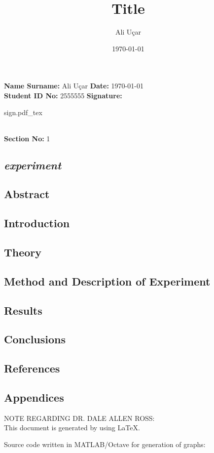 \documentclass[a4paper, 12pt]{article}
\newcommand{\head}[1]{\section{\normalsize{\textit{#1}}}}
\newcommand{\subhead}[1]{\subsection{\normalsize{#1}}}
\newcommand{\incfig}[1]{%
    \def\svgwidth{\columnwidth}
    {#1.pdf_tex}
}
\begin{document}
    \title{Title}
    \author{Ali Uçar}
    \date{\today}

    \noindent
    \textbf{Name Surname:} Ali Uçar
    \hfill \textbf{Date:} \today \\
    \textbf{Student ID No:} 2555555
    \hfill \textbf{Signature:}
    \begin{minipage}[t]{0.05\linewidth}
        \incfig{sign}
    \end{minipage} \\
    \textbf{Section No:} 1

    \begin{center}
        \head{experiment}
    \end{center}


    \subhead{Abstract}


    \subhead{Introduction}


    \subhead{Theory}


    \subhead{Method and Description of Experiment}


    \subhead{Results}


    \subhead{Conclusions}


    \subhead{References}


    \subhead{Appendices}
    \noindent
    NOTE REGARDING DR. DALE ALLEN ROSS: \\
    This document is generated by using LaTeX.

    \medskip
    \noindent
    Source code written in MATLAB/Octave for generation of graphs:

    \clearpage
\end{document}
